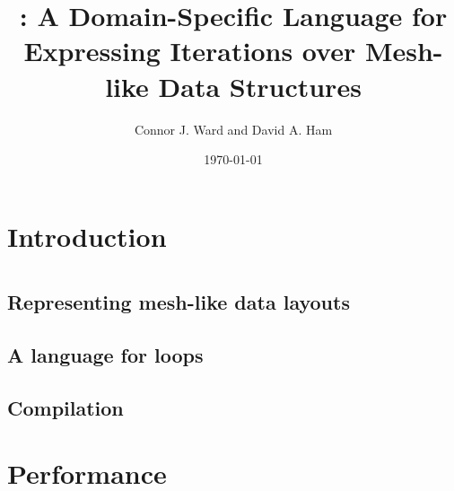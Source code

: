 \documentclass[a4,10pt]{article}
\title{\pyop3: A Domain-Specific Language for Expressing Iterations over Mesh-like Data Structures}
\author{Connor J. Ward and David A. Ham}
\date{\today}
\begin{document}
  \maketitle

  \begin{abstract}

  \end{abstract}

  \section{Introduction}


  \section{}

  \subsection{Representing mesh-like data layouts}


  \subsection{A language for loops}



  \subsection{Compilation}

  \section{Performance}



\end{document}
